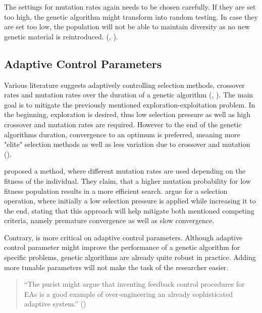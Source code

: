 The settings for mutation rates again needs to be chosen carefully. If they are set too high, the genetic algorithm might transform into random testing. In case they are set too low, the population will not be able to maintain diversity as no new genetic material is reintroduced. (\cite{klampfl_using_nodate}, \cite{grefenstette_optimization_1986}).

\subsection{Adaptive Control Parameters}
Various literature suggests adaptively controlling selection methods, crossover rates and mutation rates over the duration of a genetic algorithm (\cite{marsili_libelli_adaptive_2000}, ). The main goal is to mitigate the previously mentioned exploration-exploitation problem. In the beginning, exploration is desired, thus low selection pressure as well as high crossover and mutation rates are required. However to the end of the genetic algorithms duration, convergence to an optimum is preferred, meaning more "elite" selection methods as well as less variation due to crossover and mutation (\cite{srinivas_genetic_1994}).

\cite{marsili_libelli_adaptive_2000} proposed a method, where different mutation rates are used depending on the fitness of the individual. They claim, that a higher mutation probability for low fitness population results in a more efficient search. \cite{hussain_trade-off_2020} argue for a selection operation, where initially a low selection pressure is applied while increasing it to the end, stating that this approach will help mitigate both mentioned competing criteria, namely premature convergence as well as slow convergence.

Contrary, \cite{kacprzyk_parameter_2007} is more critical on adaptive control parameters. Although adaptive control parameter might improve the performance of a genetic algorithm for specific problems, genetic algorithms are already quite robust in practice. Adding more tunable parameters will not make the task of the researcher easier.

\begin{quote}
	\begin{em}
		\enquote{The purist might argue that inventing feedback control procedures for EAs is a good example of over-engineering an already sophisticated adaptive system.} (\cite{kacprzyk_parameter_2007})
	\end{em}
\end{quote}

